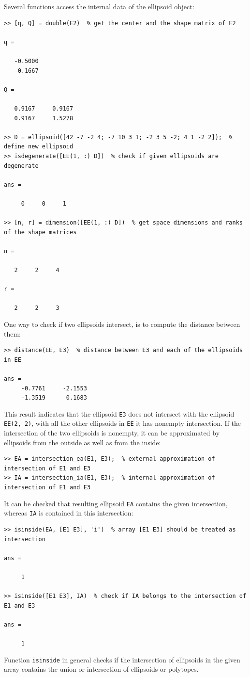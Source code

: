 \documentclass{report}
\begin{document}
Several functions  access the internal data of
the ellipsoid object:
{\tt \begin{verbatim}
>> [q, Q] = double(E2)  % get the center and the shape matrix of E2

q =

   -0.5000
   -0.1667

Q =

   0.9167     0.9167
   0.9167     1.5278

>> D = ellipsoid([42 -7 -2 4; -7 10 3 1; -2 3 5 -2; 4 1 -2 2]);  % define new ellipsoid
>> isdegenerate([EE(1, :) D])  % check if given ellipsoids are degenerate

ans =

     0     0     1

>> [n, r] = dimension([EE(1, :) D])  % get space dimensions and ranks of the shape matrices

n =

   2     2     4

r =

   2     2     3
\end{verbatim} }
One way to check if two ellipsoids intersect, is to compute
the distance between them:
{\tt \begin{verbatim}
>> distance(EE, E3)  % distance between E3 and each of the ellipsoids in EE

ans =
     -0.7761     -2.1553
     -1.3519      0.1683
\end{verbatim} }
This result indicates that the ellipsoid {\tt E3} does not intersect with
the ellipsoid {\tt EE(2, 2)}, with all the other ellipsoids in {\tt EE}
it has nonempty intersection. If the intersection of the two ellipsoids is
nonempty, it can be approximated by ellipsoids from the outside as well as
from the inside:
{\tt \begin{verbatim}
>> EA = intersection_ea(E1, E3);  % external approximation of intersection of E1 and E3
>> IA = intersection_ia(E1, E3);  % internal approximation of intersection of E1 and E3
\end{verbatim} }
It can be checked that resulting ellipsoid {\tt EA} contains the given
intersection, whereas {\tt IA} is contained in this intersection:
{\tt \begin{verbatim}
>> isinside(EA, [E1 E3], 'i')  % array [E1 E3] should be treated as intersection

ans =

     1

>> isinside([E1 E3], IA)  % check if IA belongs to the intersection of E1 and E3

ans =

     1
\end{verbatim} }
Function {\tt isinside} in general checks if the intersection of ellipsoids
in the given array contains the union or intersection of ellipsoids or
polytopes.
\end{document}

